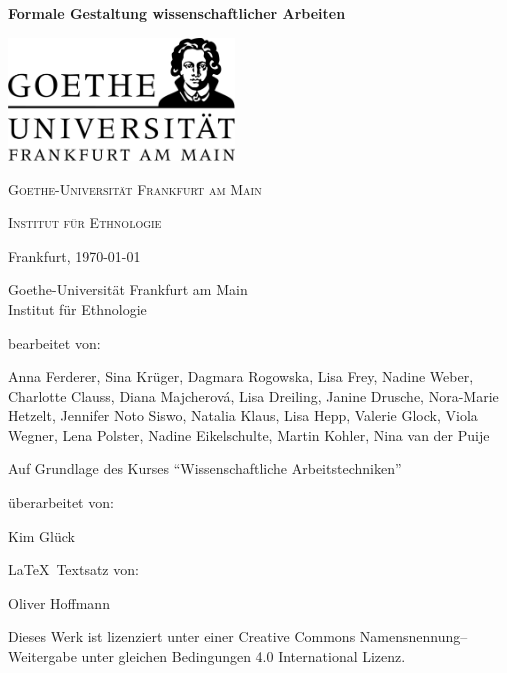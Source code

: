 \documentclass[ 12pt,
                titlepage,
                parskip=half,
                version=first,
                bibliography=totocnumbered,
                final,
                listof=totoc]{scrartcl}
\begin{document}
\begin{titlepage}

\begin{center}
\vspace*{0.5cm}

\huge
\textbf{Formale Gestaltung wissenschaftlicher Arbeiten}

\vspace{3.7cm}

\includegraphics[width=0.45\textwidth]{images/goethe-logo.png}

\vspace{3.7cm}

\LARGE
\textsc{Goethe-Universität Frankfurt am Main}

\Large
\textsc{Institut für Ethnologie}

\vfill

\large
Frankfurt, \today

\end{center}

\end{titlepage}

Goethe-Universität Frankfurt am Main\\
Institut für Ethnologie
\vfill


bearbeitet von:

Anna Ferderer, Sina Krüger, Dagmara Rogowska, Lisa Frey, Nadine Weber, Charlotte
Clauss, Diana Majcherová, Lisa Dreiling, Janine Drusche, Nora-Marie Hetzelt,
Jennifer Noto Siswo, Natalia Klaus, Lisa Hepp, Valerie Glock, Viola Wegner, Lena
Polster, Nadine Eikelschulte, Martin Kohler, Nina van der Puije

Auf Grundlage des Kurses \enquote{Wissenschaftliche Arbeitstechniken}

überarbeitet von:

Kim Glück

\LaTeX~Textsatz von:

Oliver Hoffmann
\vfill
\begin{center}
\ccbysa

Dieses Werk ist lizenziert unter einer Creative Commons Namensnennung--
Weitergabe unter gleichen Bedingungen 4.0 International Lizenz.
\end{center}
\end{document}

